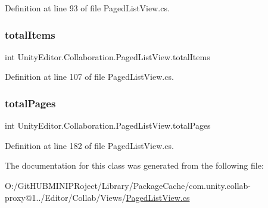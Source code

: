 Definition at line 93 of file Paged\+List\+View.\+cs.

\mbox{\label{class_unity_editor_1_1_collaboration_1_1_paged_list_view_a7d46fb1e4bb240bafed65a39b6f59182}} 
\subsubsection{\texorpdfstring{totalItems}{totalItems}}
{\footnotesize\ttfamily int Unity\+Editor.\+Collaboration.\+Paged\+List\+View.\+total\+Items\hspace{0.3cm}{\ttfamily [set]}}



Definition at line 107 of file Paged\+List\+View.\+cs.

\mbox{\label{class_unity_editor_1_1_collaboration_1_1_paged_list_view_abaa492b7e20d2b0ba8777c62590a2b7f}} 
\subsubsection{\texorpdfstring{totalPages}{totalPages}}
{\footnotesize\ttfamily int Unity\+Editor.\+Collaboration.\+Paged\+List\+View.\+total\+Pages\hspace{0.3cm}{\ttfamily [get]}}



Definition at line 182 of file Paged\+List\+View.\+cs.



The documentation for this class was generated from the following file\+:\begin{DoxyCompactItemize}
\item 
O\+:/\+Git\+H\+U\+B\+M\+I\+N\+I\+P\+Roject/\+Library/\+Package\+Cache/com.\+unity.\+collab-\/proxy@1../\+Editor/\+Collab/\+Views/\mbox{\hyperlink{_paged_list_view_8cs}{Paged\+List\+View.\+cs}}\end{DoxyCompactItemize}
